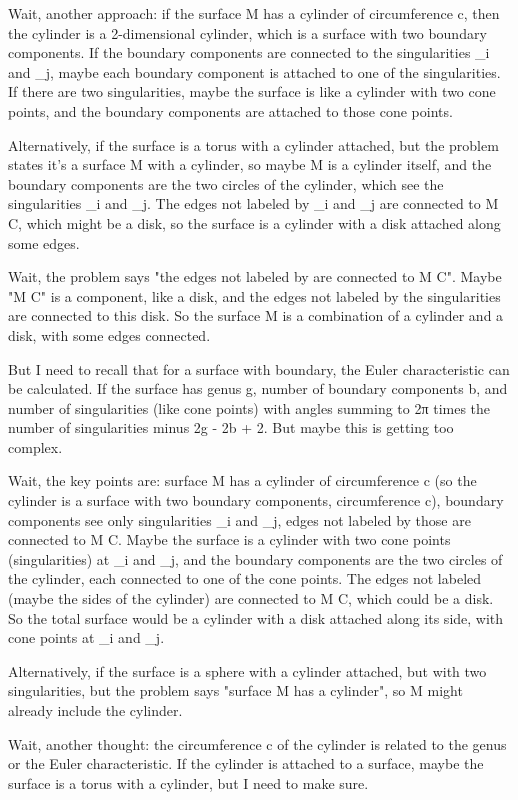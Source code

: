 Wait, another approach: if the surface M has a cylinder of circumference c, then the cylinder is a 2-dimensional cylinder, which is a surface with two boundary components. If the boundary components are connected to the singularities _i and _j, maybe each boundary component is attached to one of the singularities. If there are two singularities, maybe the surface is like a cylinder with two cone points, and the boundary components are attached to those cone points. 

Alternatively, if the surface is a torus with a cylinder attached, but the problem states it's a surface M with a cylinder, so maybe M is a cylinder itself, and the boundary components are the two circles of the cylinder, which see the singularities _i and _j. The edges not labeled by _i and _j are connected to M C, which might be a disk, so the surface is a cylinder with a disk attached along some edges. 

Wait, the problem says "the edges not labeled by are connected to M C". Maybe "M C" is a component, like a disk, and the edges not labeled by the singularities are connected to this disk. So the surface M is a combination of a cylinder and a disk, with some edges connected. 

But I need to recall that for a surface with boundary, the Euler characteristic can be calculated. If the surface has genus g, number of boundary components b, and number of singularities (like cone points) with angles summing to 2π times the number of singularities minus 2g - 2b + 2. But maybe this is getting too complex. 

Wait, the key points are: surface M has a cylinder of circumference c (so the cylinder is a surface with two boundary components, circumference c), boundary components see only singularities _i and _j, edges not labeled by those are connected to M C. Maybe the surface is a cylinder with two cone points (singularities) at _i and _j, and the boundary components are the two circles of the cylinder, each connected to one of the cone points. The edges not labeled (maybe the sides of the cylinder) are connected to M C, which could be a disk. So the total surface would be a cylinder with a disk attached along its side, with cone points at _i and _j. 

Alternatively, if the surface is a sphere with a cylinder attached, but with two singularities, but the problem says "surface M has a cylinder", so M might already include the cylinder. 

Wait, another thought: the circumference c of the cylinder is related to the genus or the Euler characteristic. If the cylinder is attached to a surface, maybe the surface is a torus with a cylinder, but I need to make sure. 


